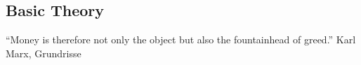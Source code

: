 \documentclass[10pt, letterpaper]{article}
\begin{document}
\begin{spacing}{1.8}



\section{Basic Theory}

\noindent``Money is therefore not only the object but also the fountainhead of greed.'' Karl Marx, Grundrisse\\
 



\end{spacing}
\end{document}
